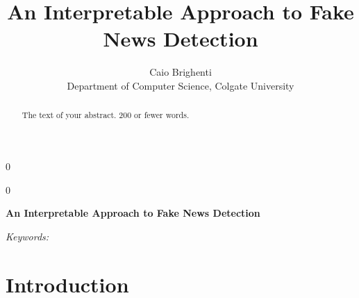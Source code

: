 \documentclass[12pt]{article}
\newcommand{\blind}{0}
\begin{document}
\def\spacingset#1{\renewcommand{\baselinestretch}%
{#1}\small\normalsize} \spacingset{1}



\blind
{
  \title{\bf An Interpretable Approach to Fake News Detection}

  \author{
        Caio Brighenti \\
    Department of Computer Science, Colgate University\\
      }
  \maketitle
} \fi

\blind
{
  \bigskip
  \bigskip
  \bigskip
  \begin{center}
    {\LARGE\bf An Interpretable Approach to Fake News Detection}
  \end{center}
  \medskip
} \fi

\bigskip
\begin{abstract}
The text of your abstract. 200 or fewer words.
\end{abstract}

\noindent%
{\it Keywords:} 
\vfill

\newpage
\spacingset{1.45} %

\section{Introduction}
\label{sec:intro}
\end{document}
